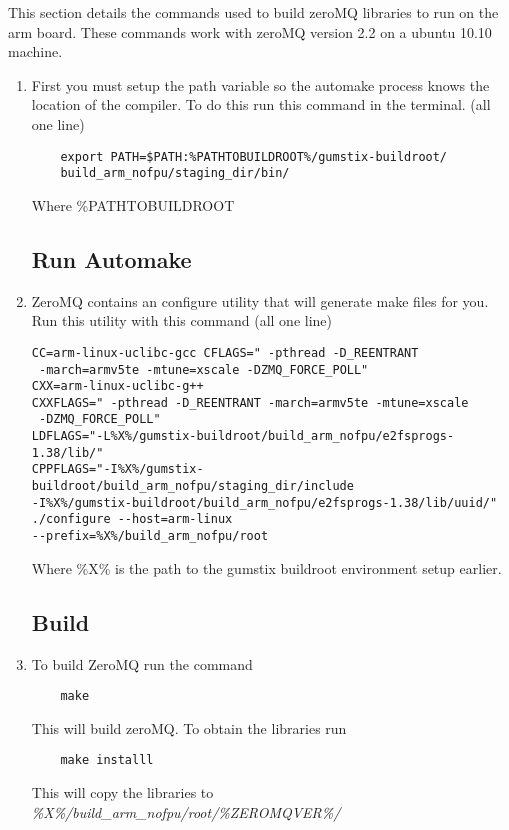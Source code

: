 This section details the commands used to build zeroMQ libraries to run on the arm board. These commands work with zeroMQ version 2.2 on a ubuntu 10.10 machine. 

\begin{enumerate}
	\subsection{Setup path variable}
	\item First you must setup the path variable so the automake process knows the location of the compiler. To do this run this command in the terminal. (all one line)
 \begin{verbatim}
	export PATH=$PATH:%PATHTOBUILDROOT%/gumstix-buildroot/
	build_arm_nofpu/staging_dir/bin/
\end{verbatim}
	Where \%PATHTOBUILDROOT%

	\subsection{Run Automake}
	\item ZeroMQ contains an configure utility that will generate make files for you. Run this utility with this command (all one line)
\begin{verbatim}
CC=arm-linux-uclibc-gcc CFLAGS=" -pthread -D_REENTRANT
 -march=armv5te -mtune=xscale -DZMQ_FORCE_POLL" 
CXX=arm-linux-uclibc-g++ 
CXXFLAGS=" -pthread -D_REENTRANT -march=armv5te -mtune=xscale
 -DZMQ_FORCE_POLL"
LDFLAGS="-L%X%/gumstix-buildroot/build_arm_nofpu/e2fsprogs-1.38/lib/"
CPPFLAGS="-I%X%/gumstix-buildroot/build_arm_nofpu/staging_dir/include 
-I%X%/gumstix-buildroot/build_arm_nofpu/e2fsprogs-1.38/lib/uuid/"
./configure --host=arm-linux 
--prefix=%X%/build_arm_nofpu/root
\end{verbatim}
	Where \%X\% is the path to the gumstix buildroot environment setup earlier.

	\subsection{Build}
	\item To build ZeroMQ run the command
\begin{verbatim}
	make
\end{verbatim}
	This will build zeroMQ. To obtain the libraries run
\begin{verbatim}
	make installl
\end{verbatim}
	This will copy the libraries to \emph{\%X\%/build\_arm\_nofpu/root/\%ZEROMQVER\%/}
\end{enumerate}

